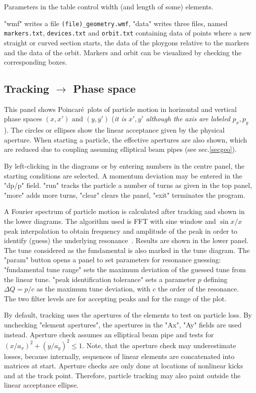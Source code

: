 \documentclass[12pt]{article}
\begin{document}
Parameters in the table control width (and length of some) elements.

"wmf" writes a file {\tt (file)\_geometry.wmf}, "data" writes three files, named
{\tt markers.txt}, {\tt devices.txt} and {\tt orbit.txt} containing data of points where
a new straight or curved section starts, the data of the ploygons relative to the markers
and the data of the orbit. Markers and orbit can be visualized by checking the corresponding
boxes.


\subsection{\label{ssectps}Tracking $\longrightarrow$ Phase space}
This panel shows Poincar\'e\ plots of particle motion in horizontal and
vertical phase spaces $(x,x')$ and $(y,y')$ ({\it it is $x',y'$ although the
axis are labeled $p_x,p_y$}). The circles or ellipses show the linear
acceptance given by the physical aperture. When starting a particle, the effective
apertures are also shown, which are reduced due to coupling
assuming elliptical beam pipes (see sec.\ref{secgeo}).

By left-clicking in the diagrams or by entering numbers in the centre panel, the
starting conditions are selected. A momentum deviation may be entered in
the "dp/p" field.
"run" tracks the particle a number of turns
as given in the top panel, "more" adds more turns, "clear" clears the panel,
"exit" terminates the program.

A Fourier spectrum of particle motion is calculated after tracking and shown in
the lower diagrams. The algorithm used is FFT with sine window and $\sin x/x$
peak interpolation to obtain frequency and amplitude of the peak in order to
identify (guess) the underlying resonance~\cite{jbthesis}. Results are shown
in the lower panel. The tune considered as the fundamental is also marked
in the tune diagram. The "param" button opens a panel to set parameters for
resonance guessing: "fundamental tune range" sets the maximum deviation of
the guessed tune from the linear tune. "peak identification tolerance" sets
a parameter $p$ defining  $\Delta Q=p/c$ as the maximum tune deviation, with $c$
the order of the resonance.  The two filter levels are for accepting peaks and for
the range of the plot.

By default, tracking uses the apertures of the elements to test on particle loss.
By unchecking "element apertures", the apertures in the "Ax", "Ay" fields are
used instead.
Aperture check assumes an elliptical beam pipe and tests for $(x/a_x)^2+(y/a_y)^2\leq 1$.
Note, that the aperture check may underestimate losses, because internally,
sequences of linear elements are concatenated into matrices at start. Aperture
checks are only done at locations of nonlinear kicks and at the track point.
Therefore, particle tracking may also paint outside the linear acceptance ellipse.
\end{document}
